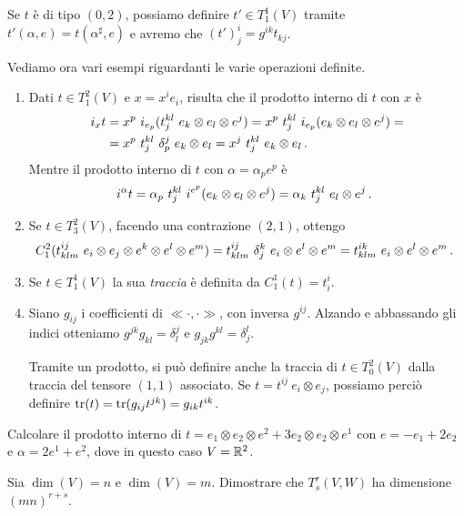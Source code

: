 \begin{example}
	Se $t$ è di tipo $(0,2)$, possiamo definire $t'\in T_1^1(V)$ tramite $t'(\alpha, e) = t(\alpha^\sharp, e)$ e avremo che $(t')_j^i = g^{ik}t_{kj}$.
\end{example}


\begin{example}
	Vediamo ora vari esempi riguardanti le varie operazioni definite.
	\begin{enumerate}
		\item Dati $t\in T_1^2(V)$ e $x=x^ie_i$, risulta che il prodotto interno di $t$ con $x$ è 
		\begin{align*}
		i_xt &= x^p\ i_{e_p}(t_j^{kl}\ e_k\otimes e_l\otimes e^j) = x^p\ t_j^{kl}\ i_{e_p} (e_k\otimes e_l\otimes e^j) =\\
		&= x^p\ t_j^{kl}\ \delta_p^j\ e_k\otimes e_l = x^j\ t_j^{kl}\ e_k\otimes e_l \punto
		\end{align*}
		Mentre il prodotto interno di $t$ con $\alpha = \alpha_pe^p$ è
		\begin{align*}
		i^\alpha t = \alpha_p\ t_j^{kl}\ i^{e^p}(e_k\otimes e_l\otimes e^j) = \alpha_k\ t_j^{kl}\ e_l\otimes e^j \, \text{. }
		\end{align*}
		
		\item Se $t\in T_3^2(V)$, facendo una contrazione $(2,1)$, ottengo
		\begin{equation*}
			C_1^2 (t_{klm}^{ij}\ e_i\otimes e_j\otimes e^k\otimes e^l\otimes e^m ) = t_{klm}^{ij}\ \delta_j^k\ e_i\otimes e^l\otimes e^m = t_{klm}^{ik}\ e_i\otimes e^l\otimes e^m \punto
		\end{equation*}
		
		\item Se $t\in T_1^1(V)$ la sua \emph{traccia} è definita da $C_1^1(t) = t_i^i$. 

		\item Siano $g_{ij}$ i coefficienti di $\ll \cdot, \cdot \gg$, con inversa $g^{ij}$. Alzando e abbassando gli indici otteniamo $g^{jk}g_{kl} = \delta_l^j$ e $g_{jk}g^{kl} = \delta_j^l$.
		
		Tramite un prodotto, si può definire anche la traccia di $t\in T_0^2(V)$ dalla traccia del tensore $(1,1)$ associato. Se $t=t^{ij}\ e_i\otimes e_j$, possiamo perciò definire $\operatorname{tr} (t) = \operatorname{tr} (g_{ij}t^{jk}) = g_{ik}t^{ik}$.
	\end{enumerate}
\end{example}

\begin{exercise}
	Calcolare il prodotto interno di $t=e_1\otimes e_2\otimes e^2+3e_2\otimes e_2\otimes e^1$ con $e = -e_1+2e_2$ e $\alpha = 2e^1+e^2$, dove in questo caso $V=\mathbb R^2$.
\end{exercise}
\begin{exercise}
	Sia $\dim(V) = n$ e $\dim(V) = m$. Dimostrare che $T_s^r(V,W)$ ha dimensione $(mn)^{r+s}$.
\end{exercise}

